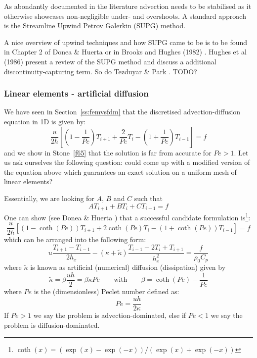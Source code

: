 As abondantly documented in the literature advection needs to be stabilised
as it otherwise showcases non-negligible under- and overshoots.
A standard approach is the Streamline Upwind Petrov Galerkin (SUPG) method.

A nice overview of upwind techniques and how SUPG came to be is to be found in Chapter 
2 of Donea \& Huerta \cite{dohu03} or in Brooks and Hughes (1982) \cite{brhu82}.
Hughes et al (1986) \cite{humm86} present a review of the SUPG method 
and discuss a additional discontinuity-capturing term. So do Tezduyar \& Park \cite{tepa86}.
TODO? 







\subsubsection{Linear elements - artificial diffusion}

We have seen in Section~\ref{ss:femvsfdm} that the discretised advection-diffusion equation 
in 1D is given by:
\[
\frac{u}{2h}
\left[
\left(1-\frac{1}{Pe}\right) T_{i+1} + \frac{2}{Pe} T_i - \left(1+\frac{1}{Pe}\right)T_{i-1} 
\right] = f
\]
and we show in Stone~\ref{f65} that the solution is far from accurate for $Pe>1$. Let us ask ourselves the 
following question: could come up with a modified version of the equation above which 
guarantees an exact solution on a uniform mesh of linear elements?

Essentially, we are looking for $A$, $B$ and $C$ such that 
\[
A T_{i+1} + BT_i + C T_{i-1} = f
\]
One can show (see Donea \& Huerta \cite{dohu03}) that a successful candidate formulation 
is\footnote{$\coth(x)=(\exp(x)-\exp(-x))/(\exp(x)+\exp(-x))$}:
\[
\frac{u}{2h}
\left[
\left(1-\coth(Pe) \right) T_{i+1} + 2 \coth(Pe) T_i - \left(1+\coth(Pe)\right) T_{i-1} 
\right] = f
\]
which can be arranged into the following form:
\begin{equation}
u
\frac{T_{i+1}-T_{i-1}}{2h_x}
-
(\kappa+ \tilde{\kappa})
\frac{T_{i-1}-2T_i+T_{i+1}}{h_x^2}
= \frac{f}{\rho_0 C_p}
\end{equation}
where 
$\tilde{\kappa}$ is known as artificial (numerical) diffusion (dissipation) given by
\[
\tilde{\kappa}=\beta \frac{u h}{2} = \beta \kappa Pe
\qquad
\text{with}
\qquad
\beta = \coth (Pe) - \frac{1}{Pe}
\]
where $Pe$ is the (dimensionless) Peclet number defined as: 
\[
\boxed{
Pe= \frac{u h }{2 \kappa}
}
\]
If $Pe>1$ we say the problem is advection-dominated, 
else if $Pe<1$ we say the problem is diffusion-dominated.

